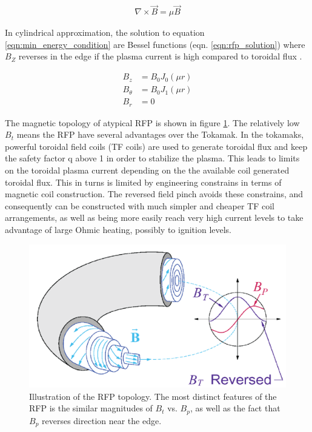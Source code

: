 \begin{refsection}
\begin{align}\label{eqn:min_energy_condition}
    \nabla \times \vec{B} = \mu \vec{B}
\end{align}

In cylindrical approximation, the solution to equation \ref{eqn:min_energy_condition} are Bessel functions (eqn. \ref{eqn:rfp_solution}) where $B_Z$ reverses in the edge if the plasma current is high compared to toroidal flux \cite{Taylor74}.

\begin{align}\label{eqn:rfp_solution}
B_z &= B_0J_0(\mu r)\\
B_\theta &= B_0 J_1(\mu r)\\
B_r & = 0
\end{align}

The magnetic topology of atypical RFP is shown in figure \ref{fig:RFP_geometry}. The relatively low $B_t$ means the RFP have several advantages over the Tokamak. In the tokamaks, powerful toroidal field coils (TF coils) are used to generate toroidal flux and keep the safety factor q above 1 in order to stabilize the plasma. This leads to limits on the toroidal plasma current depending on the the available coil generated toroidal flux. This in turns is limited by engineering constrains in terms of magnetic coil construction. The reversed field pinch avoids these constrains, and
consequently can be constructed with much simpler and cheaper TF coil arrangements, as well as being more easily reach very high current levels to take advantage of large Ohmic heating, possibly to ignition levels.

\begin{figure}[!htb]
	\centering
	\includegraphics[width = 1.\linewidth]{./1_Introduction/RFP_mag_geometry.png}
	\caption[RFP magnetic topology]{Illustration of the RFP topology. The most distinct features of the RFP is the similar magnitudes of $B_t$ vs. $B_p$, as well as the fact that $B_p$ reverses direction near the edge.}
	\label{fig:RFP_geometry}
\end{figure}%


\end{refsection}
